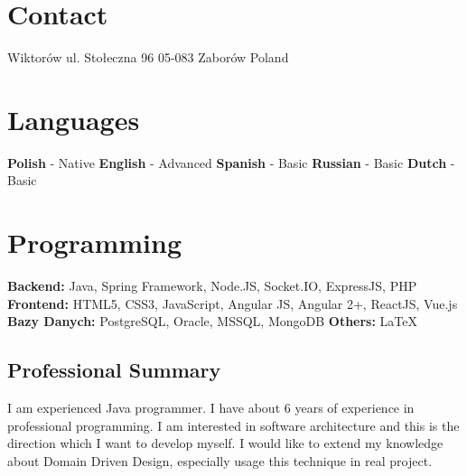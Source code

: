 \documentclass[]{friggeri-cv} %
\begin{document}
	
	\begin{aside}
		\section{Contact}
		Wiktorów
		ul. Stołeczna 96
		05-083 Zaborów
		Poland
		~
		~
		
		\section{Languages}
		\textbf{Polish} - Native
		\textbf{English} - Advanced
		\textbf{Spanish} - Basic
		\textbf{Russian} - Basic
		\textbf{Dutch} - Basic
		\section{Programming}
		\textbf{Backend:}
		Java, Spring Framework, Node.JS, Socket.IO, ExpressJS, PHP
		\textbf{Frontend:}
		HTML5, CSS3, JavaScript, Angular JS, Angular 2+, ReactJS, Vue.js
		\textbf{Bazy Danych:}
		PostgreSQL, Oracle, MSSQL, MongoDB
		\textbf{Others:}
		\LaTeX
	\end{aside}
	
	\begin{absolutelynopagebreak}
		\section{Professional Summary}
		I am experienced Java programmer. I have about 6 years of experience in professional programming. I am interested in software architecture and this is the direction which I want to develop myself. I would like to extend my knowledge about Domain Driven Design, especially usage this technique in real project.
	\end{absolutelynopagebreak}
	
\end{document}
